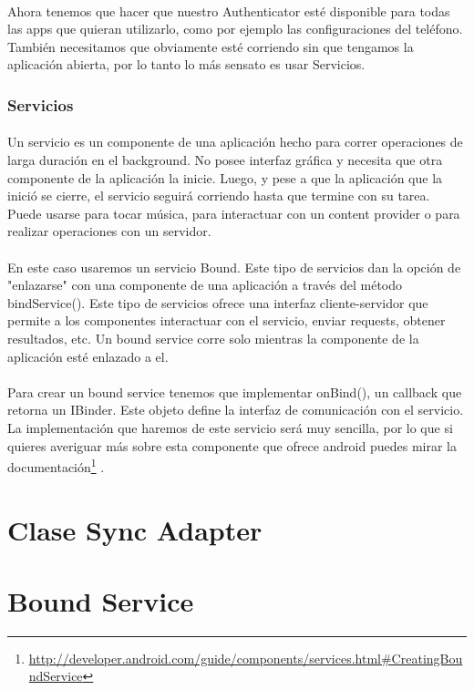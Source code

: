 \documentclass[10pt]{extarticle}
\begin{document}
\paragraph{}
Ahora tenemos que hacer que nuestro Authenticator esté disponible para todas las apps que quieran utilizarlo, como por ejemplo las configuraciones del teléfono. También necesitamos que obviamente esté corriendo sin que tengamos la aplicación abierta, por lo tanto lo más sensato es usar Servicios.

\subsubsection{Servicios}

\paragraph{}
Un servicio es un componente de una aplicación hecho para correr operaciones de larga duración en el background. No posee interfaz gráfica y necesita que otra componente de la aplicación la inicie. Luego, y pese a que la aplicación que la inició se cierre, el servicio seguirá corriendo hasta que termine con su tarea. Puede usarse para tocar música, para interactuar con un content provider o para realizar operaciones con un servidor.

\paragraph{}
En este caso usaremos un servicio Bound. Este tipo de servicios dan la opción de "enlazarse" con una componente de una aplicación a través del método bindService(). Este tipo de servicios ofrece una interfaz cliente-servidor que permite a los componentes interactuar con el servicio, enviar requests, obtener resultados, etc. Un bound service corre solo mientras la componente de la aplicación esté enlazado a el.

\paragraph{}
Para crear un bound service tenemos que implementar onBind(), un callback que retorna un IBinder. Este objeto define la interfaz de comunicación con el servicio. La implementación que haremos de este servicio será muy sencilla, por lo que si quieres averiguar más sobre esta componente que ofrece android puedes mirar la documentación\footnote{\url{http://developer.android.com/guide/components/services.html\#CreatingBoundService}}
.

\section{Clase Sync Adapter}


\section{Bound Service}
\end{document}

